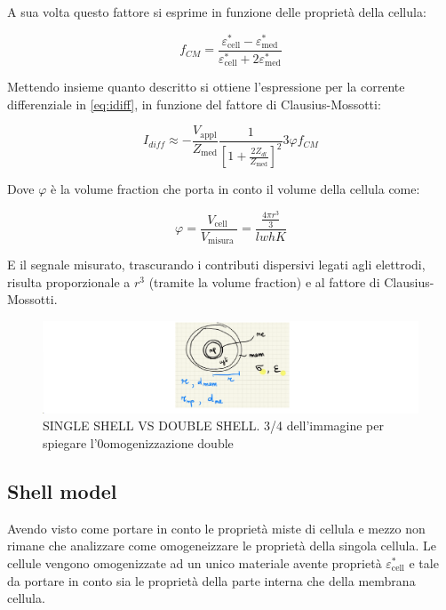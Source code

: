 A sua volta questo fattore si esprime in funzione delle proprietà della cellula:

\begin{equation}
	f_{C M}=\frac{\varepsilon_{\operatorname{c e l l}}^{*}-\varepsilon_{\operatorname{m e d}}^{*}}{\varepsilon_{\operatorname{c e l l}}^{*}+2 \varepsilon_{\operatorname{m e d}}^{*}}
\end{equation}

Mettendo insieme quanto descritto si ottiene l'espressione per la corrente differenziale in \cref{eq:idiff}, in funzione del fattore di Clausius-Mossotti:

\begin{equation}
	I_{d i f f} \approx-\frac{V_{\operatorname{a p p l}}}{Z_{\operatorname{m e d}}} \frac{1}{\left[1+\frac{2 Z_{d l}}{Z_{\operatorname{m e d}}}\right]^{2}} 3 \varphi f_{CM}
\end{equation}

Dove $\varphi$ è la volume fraction che porta in conto il volume della cellula come:

\begin{equation}
	\varphi=\frac{V_{\text {cell }}}{V_{\text {misura }}}=\frac{\frac{4 \pi r^{3}}{3}}{l w h K}
\end{equation}

E il segnale misurato, trascurando i contributi dispersivi legati agli elettrodi, risulta proporzionale a $r^3$ (tramite la volume fraction) e al fattore di Clausius-Mossotti.


\begin{figure}[h!]
	\centering
	\includegraphics[width=0.7\linewidth]{figures/screenshot001}
	\caption{SINGLE SHELL VS DOUBLE SHELL. 3/4 dell'immagine per spiegare l'0omogenizzazione double}
	\label{fig:screenshot001}
\end{figure}


\subsection{Shell model}

Avendo visto come portare in conto le proprietà miste di cellula e mezzo non rimane che analizzare come omogeneizzare le proprietà della singola cellula. 
Le cellule vengono omogenizzate ad un unico materiale avente proprietà $\varepsilon^*_{\operatorname{cell}}$ e tale da portare in conto sia le proprietà della parte interna che della membrana cellula.

